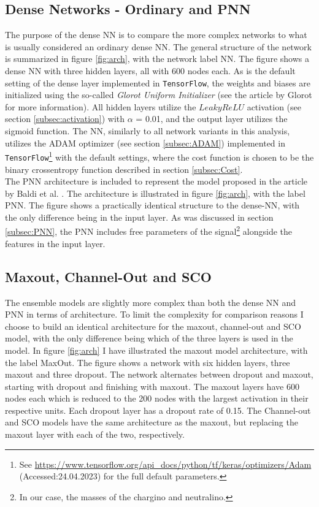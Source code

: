 \subsection*{Dense Networks - Ordinary and PNN}\label{subsec:PNNArch}
The purpose of the dense \ac{NN} is to compare the more complex networks to what is usually considered an ordinary dense \ac{NN}.
The general structure of the network is summarized in figure \ref{fig:arch}, with the network label \ac{NN}. The figure shows a dense \ac{NN} with 
three hidden layers, all with 600 nodes each.  As is the default setting of the dense layer implemented in \verb!TensorFlow!, the weights and biases are initialized 
using the so-called \emph{Glorot Uniform Initializer} (see the article by Glorot \cite{glorot_understanding_2010} for more information). All hidden layers 
utilize the $LeakyReLU$ activation (see section \ref{subsec:activation}) with $\alpha$ = 0.01, and the output layer utilizes the sigmoid function.  
The \ac{NN}, similarly to all network variants in this analysis, utilizes the \ac{ADAM} optimizer (see section \ref{subsec:ADAM}) implemented in 
\verb!TensorFlow!\footnote{See \url{https://www.tensorflow.org/api_docs/python/tf/keras/optimizers/Adam}
(Accessed:24.04.2023) for the full default parameters.} with the default settings, where the cost function is chosen to be the binary crossentropy function described
in section \ref{subsec:Cost}. 
\\
The \ac{PNN} architecture is included to represent the model proposed in the article by Baldi et al. \cite{PNN}.
The architecture is illustrated in figure \ref{fig:arch}, with the label \ac{PNN}. The figure shows a practically identical 
structure to the dense-\ac{NN}, with the only difference being in the input layer. As was discussed in section \ref{subsec:PNN},
the \ac{PNN} includes free parameters of the signal\footnote{In our case, the masses of the chargino and neutralino.} alongside the features
in the input layer.
\subsection*{Maxout, Channel-Out and SCO}
The ensemble models are slightly more complex than both the dense \ac{NN} and \ac{PNN} in terms of architecture. To limit the complexity for comparison reasons
I choose to build an identical architecture for the maxout, channel-out and \ac{SCO} model, with the only difference being which of the three layers is used in the model.  
In figure \ref{fig:arch} I have illustrated the maxout model architecture, with the label MaxOut. The figure shows a network with six hidden layers, 
three maxout and three dropout. The network alternates between dropout and maxout, starting with dropout and finishing with maxout. The maxout layers 
have 600 nodes each which is reduced to the 200 nodes with the largest activation in their respective units. Each dropout layer has a dropout 
rate of 0.15. The Channel-out and \ac{SCO} models have the same architecture as the maxout, but replacing the maxout layer with each of the two, respectively.  

